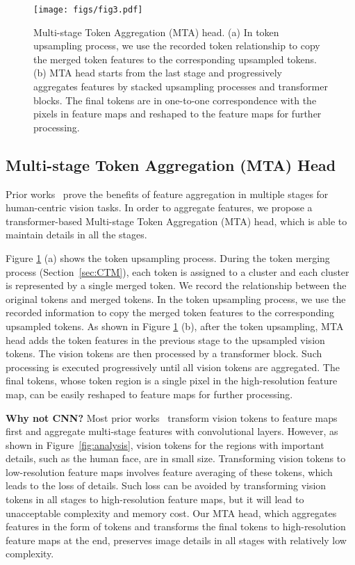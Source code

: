 \documentclass[10pt,twocolumn,letterpaper]{article}
\begin{document}
\begin{figure}[t]
	\centering
	\texttt{[image: figs/fig3.pdf]}
	\vspace{-15pt}
	\caption{
	Multi-stage Token Aggregation (MTA) head. 
	(a) 
	In token upsampling process, we use the recorded token relationship to copy the merged token features to the corresponding upsampled tokens.
	(b) MTA head starts from the last stage and progressively aggregates features by stacked upsampling processes and transformer blocks. 
	The final tokens are in one-to-one correspondence with the pixels in feature maps and reshaped to the feature maps for further processing.
	}
	\vspace{-10pt}
	\label{fig:head}
\end{figure}

\subsection{Multi-stage Token Aggregation (MTA) Head}
\label{sec:MTA}
Prior works~\cite{sun2019deep,yuan2021hrformer} prove the benefits of feature aggregation in multiple stages for human-centric vision tasks.
In order to aggregate features, we propose a transformer-based Multi-stage Token Aggregation (MTA) head, which is able to maintain details in all the stages. 



Figure \ref{fig:head} (a) shows the token upsampling process.
During the token merging process (Section~\ref{sec:CTM}), each token is assigned to a cluster and each cluster is represented by a single merged token. We record the relationship between the original tokens and merged tokens. In the token upsampling process, we use the recorded information to copy the merged token features to the corresponding upsampled tokens.
As shown in Figure \ref{fig:head} (b), after the token upsampling, MTA head adds the token features in the previous stage to the upsampled vision tokens. The vision tokens are then processed by a transformer block. Such processing is executed progressively until all vision tokens are aggregated. 
The final tokens, whose token region is a single pixel in the high-resolution feature map, can be easily reshaped to feature maps for further processing.



\textbf{Why not CNN?}
Most prior works~\cite{pvt,yuan2021hrformer,swin} transform vision tokens to feature maps first and aggregate multi-stage features with convolutional layers.
However, as shown in Figure~\ref{fig:analysis}, vision tokens for the regions with important details, such as the human face, are in small size. Transforming vision tokens to low-resolution feature maps involves feature averaging of these tokens, which leads to the loss of details. 
Such loss can be avoided by transforming vision tokens in all stages to high-resolution feature maps, but it will lead to unacceptable complexity and memory cost.
Our MTA head, which aggregates features in the form of tokens and transforms the final tokens to high-resolution feature maps at the end, preserves image details in all stages with relatively low complexity.
\end{document}
